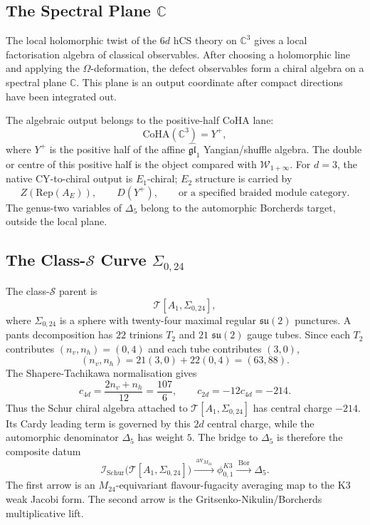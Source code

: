\subsection*{The Spectral Plane \(\mathbb C\)}

The local holomorphic twist of the \(6d\) hCS theory on \(\mathbb C^3\)
gives a local factorisation algebra of classical observables. After
choosing a holomorphic line and applying the \(\Omega\)-deformation, the
defect observables form a chiral algebra on a spectral plane
\(\mathbb C\). This plane is an output coordinate after compact
directions have been integrated out.

The algebraic output belongs to the positive-half CoHA lane:
\[
  \mathrm{CoHA}(\mathbb C^3)=Y^+,
\]
where \(Y^+\) is the positive half of the affine
\(\widehat{\mathfrak{gl}}_1\) Yangian/shuffle algebra. The double or
centre of this positive half is the object compared with
\(\mathcal W_{1+\infty}\). For \(d=3\), the native CY-to-chiral output
is \(E_1\)-chiral; \(E_2\) structure is carried by
\[
  Z(\mathrm{Rep}(A_E)),\qquad
  D(Y^+),\qquad
  \text{or a specified braided module category}.
\]
The genus-two variables of \(\Delta_5\) belong to the automorphic
Borcherds target, outside the local plane.

\subsection*{The Class-\(\mathcal S\) Curve \(\Sigma_{0,24}\)}

The class-\(\mathcal S\) parent is
\[
  \mathcal T[A_1,\Sigma_{0,24}],
\]
where \(\Sigma_{0,24}\) is a sphere with twenty-four maximal regular
\(\mathfrak{su}(2)\) punctures. A pants decomposition has \(22\)
trinions \(T_2\) and \(21\) \(\mathfrak{su}(2)\) gauge tubes. Since
each \(T_2\) contributes \((n_v,n_h)=(0,4)\) and each tube contributes
\((3,0)\),
\[
  (n_v,n_h)
  =
  21(3,0)+22(0,4)
  =
  (63,88).
\]
The Shapere-Tachikawa normalisation gives
\[
  c_{4d}
  =
  \frac{2n_v+n_h}{12}
  =
  \frac{107}{6},
  \qquad
  c_{2d}=-12c_{4d}=-214.
\]
Thus the Schur chiral algebra attached to
\(\mathcal T[A_1,\Sigma_{0,24}]\) has central charge \(-214\). Its
Cardy leading term is governed by this \(2d\) central charge, while the
automorphic denominator \(\Delta_5\) has weight \(5\). The bridge to
\(\Delta_5\) is therefore the composite datum
\[
  \mathcal I_{\mathrm{Schur}}\bigl(\mathcal T[A_1,\Sigma_{0,24}]\bigr)
  \xrightarrow{\;\mathrm{av}_{M_{24}}\;}
  \phi_{0,1}^{K3}
  \xrightarrow{\;\mathrm{Bor}\;}
  \Delta_5 .
\]
The first arrow is an \(M_{24}\)-equivariant flavour-fugacity averaging
map to the K3 weak Jacobi form. The second arrow is the
Gritsenko-Nikulin/Borcherds multiplicative lift.

